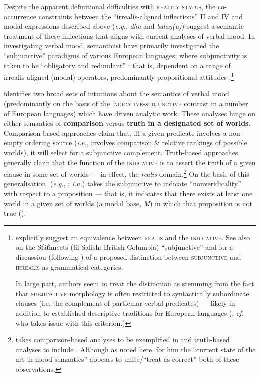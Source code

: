 Despite the apparent definitional difficulties with \textsc{reality status}, the co-occurrence constraints between the ``irrealis-aligned inflections'' \gls{II} and \gls{IV} and modal expressions described above (\textit{e.g.}, \textit{dhu }and\textit{ balaŋ(u)}) suggest a semantic treatment of these inflections that aligns with current analyses of verbal mood. In investigating verbal mood, semanticist have primarily investigated  the ``subjunctive'' paradigms of various European languages; where subjunctivity is taken to be ``obligatory and redundant'' : that is, dependent on a range of irrealis-aligned (modal) operators, predominantly propositional attitudes \citep{Palmer2001}.\footnote{\citet[238]{Chung} explicitly suggest an equivalence between \textsc{realis} and the \textsc{indicative}. See also \citealt{Matthewson2010} on the St̓át̓imcets (\gls{lil} Salish: British Columbia) ``subjunctive'' and for a discussion (following \citealt{Palmer2001}) of a proposed distinction between \textsc{subjunctive} and \textsc{irrealis} as grammatical categories.
	
	In large part, authors seem to treat the distinction as stemming from the fact that \textsc{subjunctive} morphology is often restricted to syntactically subordinate clauses (i.e. the complement of particular verbal predicates) --- likely in addition to established descriptive traditions for European languages (\citealp[see also][169\textit{ff}]{Mauri2016}, \textit{cf. }\citet[13, fn 9]{Matthewson2010} who takes issue with this criterion.)\label{SJVvIRR}}

\citet[§ 2.2]{Portner2018a} identifies two broad sets of intuitions about the semantics of verbal mood (predominantly on the basis of the \textsc{indicative-subjunctive} contrast in a number of European languages) which have driven analytic work. These analyses hinge on either semantics of \textbf{comparison} versus \textbf{truth in a designated set of worlds}. Comparison-based approaches claim that, iff a given predicate involves a non-empty ordering source (\textit{i.e.}, involves comparison \& relative rankings of possible worlds), it will select for a subjunctive complement. Truth-based approaches generally claim that the function  of the \textsc{indicative} is to assert the truth of a given clause in some set of worlds --- in effect, the \textit{realis} domain.\footnote{\citet{Portner2018a} takes comparison-based analyses to be exemplified in \citealt{Portner2012,Anand2013,Giorgi1997,Villalta2008} and truth-based analyses to include \citealt{Giannakidou2011,Farkas1992,Farkas2003,Huntley1984,Quer2001,Portner1997}. Although as noted here, for him the ``current state of the art in mood semantics'' appears to unite/``treat as correct'' both of these observations.} On the basis of this generalisation, \citeauthor{Gian2016} (\textit{e.g.}, \citeyear{Gian2016}; \citealp{Giannakidou2020} \textit{i.a.}) takes the subjunctive to indicate ``nonveridicality'' with respect to a proposition --- that is, it indicates that there exists at least one world in a given set of worlds (a modal base, \textit{M}) in which that proposition is not true ().

